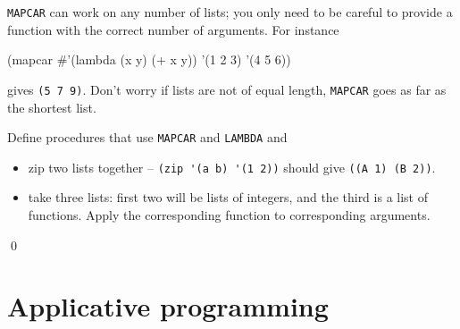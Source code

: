 \documentclass[a4paper,11pt]{article}
\begin{document}
\begin{uexercise}
\label{multi-mapcar}

\Verb+MAPCAR+ can work on any number of lists; you only need to be careful to provide a function with the correct number of arguments. For instance

\begin{lispcode}
(mapcar #'(lambda (x y) (+ x y)) '(1 2 3) '(4 5 6))
\end{lispcode}
gives \Verb+(5 7 9)+. Don't worry if lists are not of equal length, \Verb+MAPCAR+ goes as far as the shortest list.

Define procedures that use \Verb+MAPCAR+ and \Verb+LAMBDA+ and

\begin{itemize}
\item zip two lists together -- \Verb+(zip '(a b) '(1 2))+ should give \Verb+((A 1) (B 2))+. 
\item take three lists: first two will be lists of integers, and the third is a list of functions. Apply the corresponding function to corresponding arguments.
\end{itemize}

\qed
\end{uexercise}

\noindent \hrulefill

\newpage

\section{Applicative programming}
\end{document}
